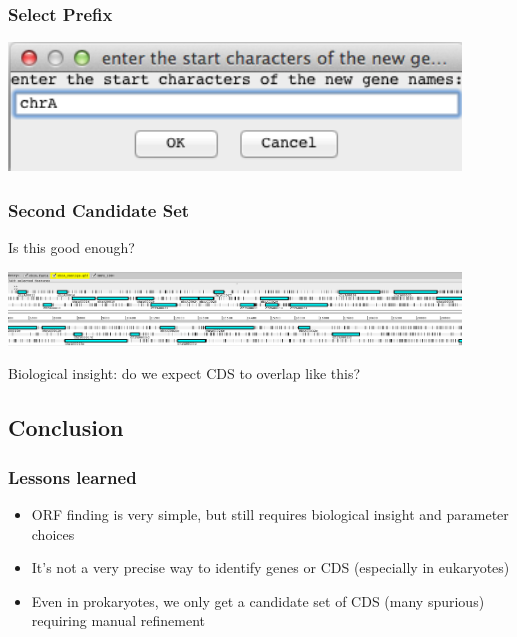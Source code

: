 \begin{frame}
  \frametitle{Select Prefix}    
  \begin{center}
    \includegraphics[width=0.9\textwidth]{images/artemis_orf13}     
  \end{center}
\end{frame}

\begin{frame}
  \frametitle{Second Candidate Set}   
  Is this good enough? 
  \begin{center}
    \includegraphics[width=0.9\textwidth]{images/artemis_orf14}     
  \end{center}
  Biological insight: do we expect CDS to overlap like this?
\end{frame}

\subsection{Conclusion}
\begin{frame}
  \frametitle{Lessons learned}   
  \begin{itemize}
    \item ORF finding is very simple, but still requires biological insight and parameter choices
    \item It's not a very precise way to identify genes or CDS (especially in eukaryotes)
    \item Even in prokaryotes, we only get a candidate set of CDS (many spurious) requiring manual refinement
  \end{itemize}
\end{frame}
